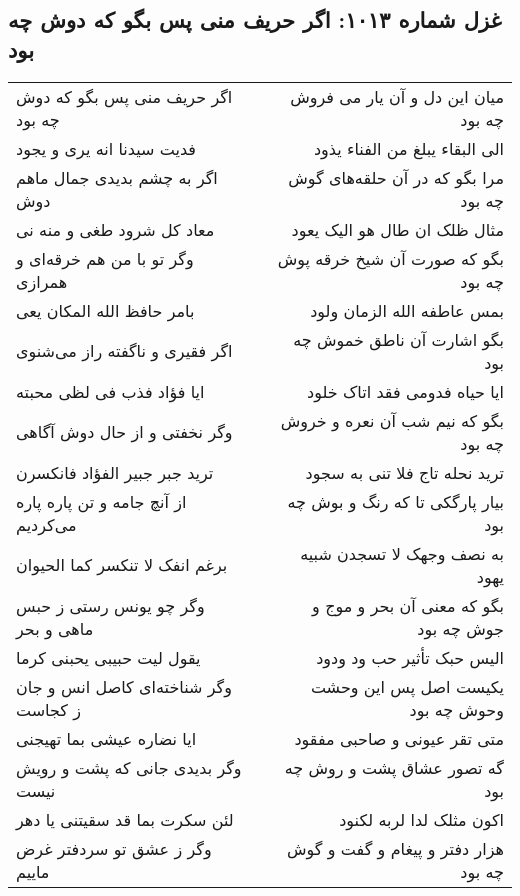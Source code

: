 \begin{center}
\section*{غزل شماره ۱۰۱۳: اگر حریف منی پس بگو که دوش چه بود}
\label{sec:1013}
\begin{longtable}{l p{0.5cm} r}
اگر حریف منی پس بگو که دوش چه بود
&&
میان این دل و آن یار می فروش چه بود
\\
فدیت سیدنا انه یری و یجود
&&
الی البقاء یبلغ من الفناء یذود
\\
اگر به چشم بدیدی جمال ماهم دوش
&&
مرا بگو که در آن حلقه‌های گوش چه بود
\\
معاد کل شرود طغی و منه نی
&&
مثال ظلک ان طال هو الیک یعود
\\
وگر تو با من هم خرقه‌ای و همرازی
&&
بگو که صورت آن شیخ خرقه پوش چه بود
\\
بامر حافظ الله المکان یعی
&&
بمس عاطفه الله الزمان ولود
\\
اگر فقیری و ناگفته راز می‌شنوی
&&
بگو اشارت آن ناطق خموش چه بود
\\
ایا فؤاد فذب فی لظی محبته
&&
ایا حیاه فدومی فقد اتاک خلود
\\
وگر نخفتی و از حال دوش آگاهی
&&
بگو که نیم شب آن نعره و خروش چه بود
\\
ترید جبر جبیر الفؤاد فانکسرن
&&
ترید نحله تاج فلا تنی به سجود
\\
از آنچ جامه و تن پاره پاره می‌کردیم
&&
بیار پارگکی تا که رنگ و بوش چه بود
\\
برغم انفک لا تنکسر کما الحیوان
&&
به نصف وجهک لا تسجدن شبیه یهود
\\
وگر چو یونس رستی ز حبس ماهی و بحر
&&
بگو که معنی آن بحر و موج و جوش چه بود
\\
یقول لیت حبیبی یحبنی کرما
&&
الیس حبک تأثیر حب ود ودود
\\
وگر شناخته‌ای کاصل انس و جان ز کجاست
&&
یکیست اصل پس این وحشت وحوش چه بود
\\
ایا نضاره عیشی بما تهیجنی
&&
متی تقر عیونی و صاحبی مفقود
\\
وگر بدیدی جانی که پشت و رویش نیست
&&
گه تصور عشاق پشت و روش چه بود
\\
لئن سکرت بما قد سقیتنی یا دهر
&&
اکون مثلک لدا لربه لکنود
\\
وگر ز عشق تو سردفتر غرض ماییم
&&
هزار دفتر و پیغام و گفت و گوش چه بود
\\
\end{longtable}
\end{center}
